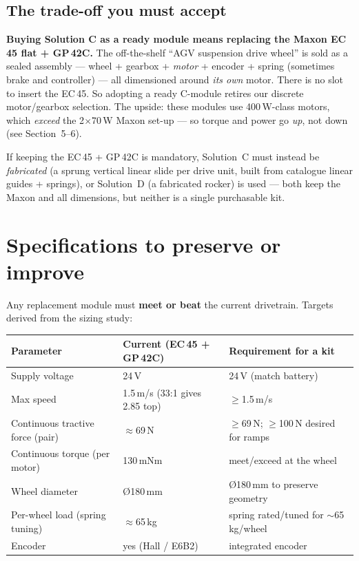\documentclass[11pt,a4paper]{article}
\newcommand{\prio}[1]{\colorbox{amber}{\parbox{\dimexpr\linewidth-2\fboxsep}{#1}}}
\begin{document}
\subsection{The trade-off you must accept}
\prio{\textbf{Buying Solution C as a ready module means replacing the Maxon EC\,45 flat + GP\,42C.}
The off-the-shelf ``AGV suspension drive wheel'' is sold as a sealed assembly --- wheel + gearbox +
\emph{motor} + encoder + spring (sometimes brake and controller) --- all dimensioned around \emph{its own}
motor. There is no slot to insert the EC\,45. So adopting a ready C-module retires our discrete
motor/gearbox selection. The upside: these modules use 400\,W-class motors, which \emph{exceed} the
2$\times$70\,W Maxon set-up --- so torque and power go \emph{up}, not down (see Section~5--6).}

\medskip
\noindent If keeping the EC\,45 + GP\,42C is mandatory, Solution~C must instead be \emph{fabricated}
(a sprung vertical linear slide per drive unit, built from catalogue linear guides + springs), or
Solution~D (a fabricated rocker) is used --- both keep the Maxon and all dimensions, but neither is a
single purchasable kit.

\section{Specifications to preserve or improve}
Any replacement module must \textbf{meet or beat} the current drivetrain. Targets derived from the
sizing study:

\begin{center}\small
\renewcommand{\arraystretch}{1.25}
\begin{tabularx}{\linewidth}{@{}p{5.2cm}p{4.3cm}Y@{}}
\toprule
\textbf{Parameter} & \textbf{Current (EC\,45 + GP\,42C)} & \textbf{Requirement for a kit} \\
\midrule
Supply voltage & 24\,V & 24\,V (match battery) \\
Max speed & 1.5\,m/s (33:1 gives 2.85 top) & $\geq$1.5\,m/s \\
Continuous tractive force (pair) & $\approx$69\,N & $\geq$69\,N; $\geq$100\,N desired for ramps \\
Continuous torque (per motor) & 130\,mNm~\cite{maxon} & meet/exceed at the wheel \\
Wheel diameter & \O180\,mm & \O180\,mm to preserve geometry \\
Per-wheel load (spring tuning) & $\approx$65\,kg & spring rated/tuned for $\sim$65\,kg/wheel \\
Encoder & yes (Hall / E6B2) & integrated encoder \\
\bottomrule
\end{tabularx}
\end{center}
\end{document}
